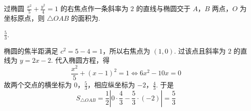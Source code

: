 \begin{problem}
过椭圆 \(\frac{x^2}{5} + \frac{y^2}{4} = 1\) 的右焦点作一条斜率为 \(2\) 的直线与椭圆交于 \(A\)，\(B\) 两点，\(O\) 为坐标原点，则 \(\triangle OAB\) 的面积为\fillinblank{}.
\end{problem}

\begin{answer}
\(\frac{5}{3}\).
\end{answer}

\begin{solution}
椭圆的焦半距满足 \(c^2=5-4=1\)，所以右焦点为 \((1,0)\). 过该点且斜率为 \(2\) 的直线为 \(y=2x-2\). 代入椭圆方程，得
\[
\frac{x^2}{5}+(x-1)^2=1\iff 6x^2-10x=0
\]
故两个交点的横坐标为 \(0\)，\(\frac53\)，相应纵坐标为 \(-2\)，\(\frac43\). 于是
\[
S_{\triangle OAB}=\frac12\left|0\cdot\frac43-\frac53\cdot(-2)\right|=\frac53
\]
\end{solution}

